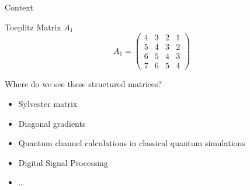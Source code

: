 % 

\begin{frame}{Context}
    \begin{block}{Toeplitz Matrix $A_{1}$}
    \[
        A_{1} = \begin{pmatrix}
        4 & 3 & 2 & 1 \\
        5 & 4 & 3 & 2 \\
        6 & 5 & 4 & 3 \\
        7 & 6 & 5 & 4
        \end{pmatrix}
    \]
    \end{block}
    \begin{block}{Where do we see these structured matrices?}
        \begin{itemize}
          \item Sylvester matrix
          \item Diagonal gradients
          \item Quantum channel calculations in classical quantum simulations
          \item Digital Signal Processing
          \item \dots
        \end{itemize}
    \end{block}
\end{frame}